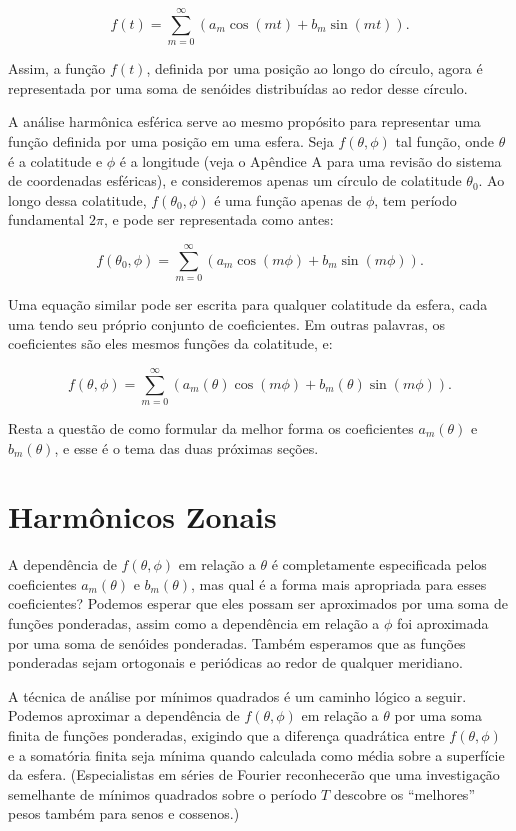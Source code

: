 $$
f(t) = \sum_{m=0}^{\infty} \left( a_m \cos(mt) + b_m \sin(mt) \right).
$$

Assim, a função $f(t)$, definida por uma posição ao longo do círculo, agora é representada por uma soma de senóides distribuídas ao redor desse círculo.

A análise harmônica esférica serve ao mesmo propósito para representar uma função definida por uma posição em uma esfera. Seja $f(\theta, \phi)$ tal função, onde $\theta$ é a colatitude e $\phi$ é a longitude (veja o Apêndice A para uma revisão do sistema de coordenadas esféricas), e consideremos apenas um círculo de colatitude $\theta_0$. Ao longo dessa colatitude, $f(\theta_0, \phi)$ é uma função apenas de $\phi$, tem período fundamental $2\pi$, e pode ser representada como antes:

$$
f(\theta_0, \phi) = \sum_{m=0}^{\infty} \left( a_m \cos(m\phi) + b_m \sin(m\phi) \right).
$$

Uma equação similar pode ser escrita para qualquer colatitude da esfera, cada uma tendo seu próprio conjunto de coeficientes. Em outras palavras, os coeficientes são eles mesmos funções da colatitude, e:

$$
f(\theta, \phi) = \sum_{m=0}^{\infty} \left( a_m(\theta) \cos(m\phi) + b_m(\theta) \sin(m\phi) \right). \tag{6.2}
$$

Resta a questão de como formular da melhor forma os coeficientes $a_m(\theta)$ e $b_m(\theta)$, e esse é o tema das duas próximas seções.




\section{Harmônicos Zonais}



A dependência de $f(\theta, \phi)$ em relação a $\theta$ é completamente especificada pelos coeficientes $a_m(\theta)$ e $b_m(\theta)$, mas qual é a forma mais apropriada para esses coeficientes? Podemos esperar que eles possam ser aproximados por uma soma de funções ponderadas, assim como a dependência em relação a $\phi$ foi aproximada por uma soma de senóides ponderadas. Também esperamos que as funções ponderadas sejam ortogonais e periódicas ao redor de qualquer meridiano.

A técnica de análise por mínimos quadrados é um caminho lógico a seguir. Podemos aproximar a dependência de $f(\theta, \phi)$ em relação a $\theta$ por uma soma finita de funções ponderadas, exigindo que a diferença quadrática entre $f(\theta, \phi)$ e a somatória finita seja mínima quando calculada como média sobre a superfície da esfera. (Especialistas em séries de Fourier reconhecerão que uma investigação semelhante de mínimos quadrados sobre o período $T$ descobre os “melhores” pesos também para senos e cossenos.)

